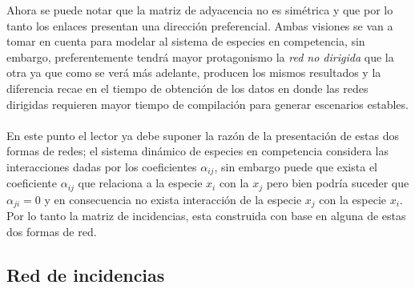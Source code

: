 Ahora se puede notar que la matriz de adyacencia no es simétrica y que por lo tanto los enlaces presentan una dirección preferencial. Ambas visiones se van a tomar en cuenta para modelar al sistema de especies en competencia, sin embargo, preferentemente tendrá mayor protagonismo la \textit{red no dirigida} que la otra ya que como se verá más adelante, producen los mismos resultados y la diferencia recae en el tiempo de obtención de los datos en donde las redes dirigidas requieren mayor tiempo de compilación para generar escenarios estables.\\
\\
En este punto el lector ya debe suponer la razón de la presentación de estas dos formas de redes; el sistema dinámico de especies en competencia considera las interacciones dadas por los coeficientes $\alpha_{ij}$, sin embargo puede que exista el coeficiente $\alpha_{ij}$ que relaciona a la especie $x_i$ con la $x_j$ pero bien podría suceder que $\alpha_{ji}=0$ y en consecuencia no exista interacción de la especie $x_j$ con la especie $x_i$. Por lo tanto la matriz de incidencias, esta construida con base en alguna de estas dos formas de red. 

\subsection{Red de incidencias}

